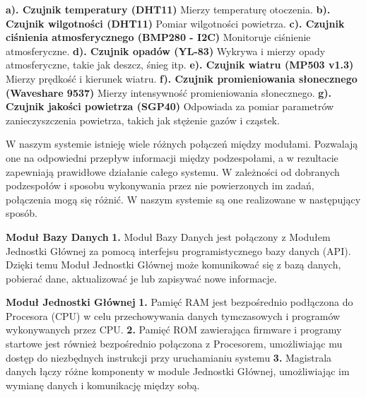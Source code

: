 \documentclass{article}
\begin{document}
\begin{flushleft}
    \textbf{a). Czujnik temperatury (DHT11)} Mierzy temperaturę otoczenia. \newline
    \textbf{b). Czujnik wilgotności (DHT11)} Pomiar wilgotności powietrza. \newline
    \textbf{c). Czujnik ciśnienia atmosferycznego (BMP280 - I2C)} Monitoruje ciśnienie atmosferyczne. \newline
    \textbf{d). Czujnik opadów (YL-83)} Wykrywa i mierzy opady atmosferyczne, takie jak deszcz, śnieg itp. \newline
    \textbf{e). Czujnik wiatru (MP503 v1.3)} Mierzy prędkość i kierunek wiatru. \newline
    \textbf{f). Czujnik promieniowania słonecznego (Waveshare 9537)} Mierzy intensywność promieniowania słonecznego. \newline
    \textbf{g). Czujnik jakości powietrza (SGP40)} Odpowiada za pomiar parametrów zanieczyszczenia powietrza, takich jak stężenie gazów i cząstek. \newline
\end{flushleft}
\newpage
\begin{center}
    \large W naszym systemie istnieję wiele różnych połączeń między modułami. Pozwalają one na odpowiedni przepływ informacji między podzespołami, a w rezultacie zapewniają prawidłowe działanie całego systemu.
    W zależności od dobranych podzespołów i sposobu wykonywania przez nie powierzonych im zadań, połączenia mogą się różnić. W naszym systemie są one realizowane w następujący sposób.
\end{center}
\begin{flushleft}
    \Large \textbf{Moduł Bazy Danych} \newline \newline
    \large
    \textbf{1.} Moduł Bazy Danych jest połączony z Modułem Jednostki Głównej za pomocą interfejsu programistycznego bazy danych (API). Dzięki temu Moduł Jednostki Głównej może komunikować się z bazą danych, pobierać dane, aktualizować je lub zapisywać nowe informacje. \newline \newline
\end{flushleft} 
\begin{flushleft}
    \Large \textbf{Moduł Jednostki Głównej} \newline \newline
    \large
    \textbf{1.} Pamięć RAM jest bezpośrednio podłączona do Procesora (CPU) w celu przechowywania danych tymczasowych i programów wykonywanych przez CPU. \newline \newline
    \textbf{2.} Pamięć ROM zawierająca firmware i programy startowe jest również bezpośrednio połączona z Procesorem, umożliwiając mu dostęp do niezbędnych instrukcji przy uruchamianiu systemu \newline \newline
    \textbf{3.} Magistrala danych łączy różne komponenty w module Jednostki Głównej, umożliwiając im wymianę danych i komunikację między sobą. \newline \newline
\end{flushleft}
\end{document}
